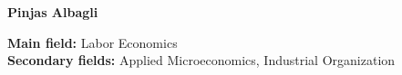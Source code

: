 \documentclass[letterpaper, 12pt]{article}
\begin{document}
	
	
	\thispagestyle{first}
	\begin{center}
		\LARGE
		\textbf{Pinjas Albagli}
	\end{center}
	
	\vspace{-2ex}
	\begin{center}
		\small\textbf{Main field:} Labor Economics\\
		\textbf{Secondary fields:} Applied Microeconomics, Industrial Organization
	\end{center}
	\vspace{2ex}


	
	
	
	\bigskip
		
	
	
	
	\bigskip
	
	
	
	
	\bigskip
	
	
	
	
	\bigskip
	
	
	
	
	\bigskip
	
	
	
	
	\bigskip
	
	
	
	
	\bigskip
	
	
	
	
	

	\thispagestyle{last}
\end{document}
